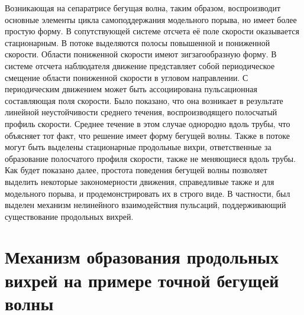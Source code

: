 Возникающая на сепаратрисе бегущая волна, таким образом, воспроизводит основные элементы цикла самоподдержания модельного порыва, но имеет более простую форму. В сопутствующей системе отсчета её поле скорости оказывается стационарным. В потоке выделяются полосы повышенной и пониженной скорости. Области пониженной скорости имеют зигзагообразную форму. В системе отсчета наблюдателя движение представляет собой периодическое смещение области пониженной скорости в угловом направлении. С периодическим движением может быть ассоциирована пульсационная составляющая поля скорости. Было показано, что она возникает в результате линейной неустойчивости среднего течения, воспроизводящего полосчатый профиль скорости. Среднее течение в этом случае однородно вдоль трубы, что объясняет тот факт, что решение имеет форму бегущей волны. Также в потоке могут быть выделены стационарные продольные вихри, ответственные за образование полосчатого профиля скорости, также не меняющиеся вдоль трубы. Как будет показано далее, простота поведения бегущей волны позволяет выделить некоторые закономерности движения, справедливые также и для модельного порыва, и продемонстрировать их в строго виде. В частности, был выделен механизм нелинейного взаимодействия пульсаций, поддерживающий существование продольных вихрей. 


\section{Механизм образования продольных вихрей на примере точной бегущей волны}

